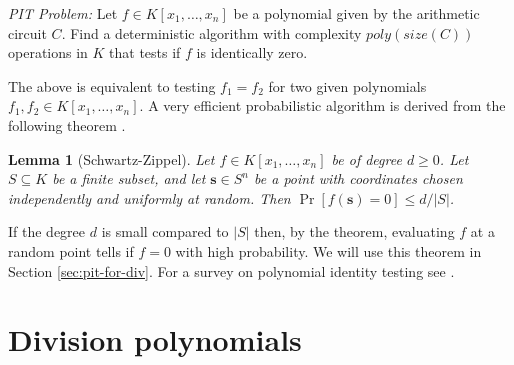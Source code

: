 \documentclass[12pt]{article}
\theoremstyle{plain}
\newtheorem{lemma}[theorem]{Lemma}
\theoremstyle{definition}
\newcommand{\abs}[1]{\left\vert#1\right\vert}
\begin{document}
\vspace*{2mm}

\textit{PIT Problem:} Let $f \in K[x_1, \dots, x_n]$ be a polynomial given by the arithmetic 
circuit $C$. Find a deterministic algorithm with complexity $poly(size(C))$ operations in $K$ that 
tests if $f$ is identically zero.

\vspace*{2mm}

The above is equivalent to testing $f_1 = f_2$ for two given polynomials $f_1, f_2 \in K[x_1, 
\dots, x_n]$. A very efficient probabilistic algorithm is derived from the following theorem 
\cite{schwartz1980,zippel1979}.
\begin{lemma}[Schwartz-Zippel]
	\label{lemma:Schwartz-Zippel}
	Let $f \in K[x_1, \dots, x_n]$ be of degree $d \ge 0$. Let $S \subseteq K$ be a finite subset, 
	and let $\mathbf{s} \in S^n$ be a point with coordinates chosen independently and uniformly at 
	random. Then $\Pr[f(\mathbf{s}) = 0] \le d / \abs{S}$.
\end{lemma}
If the degree $d$ is small compared to $\abs{S}$ then, by the theorem, evaluating $f$ at a random 
point tells if $f = 0$ with high probability. We will use this theorem in Section 
\ref{sec:pit-for-div}. For a survey on polynomial identity testing see \cite{saxena2009}.






\section{Division polynomials}
\label{sec:divpoly}
\end{document}
